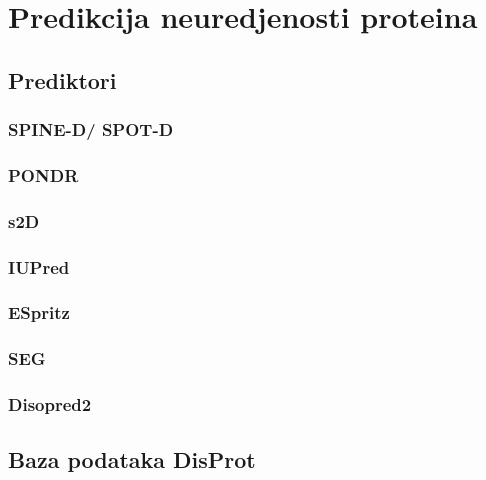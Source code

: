 
\chapter{Predikcija neuredjenosti proteina} %

\label{predikcija} %


\section{Prediktori}

\subsection{SPINE-D/ SPOT-D}



\subsection{PONDR}

\subsection{s2D}
\subsection{IUPred}
\subsection{ESpritz}
\subsection{SEG}
\subsection{Disopred2}


\section{Baza podataka DisProt}
